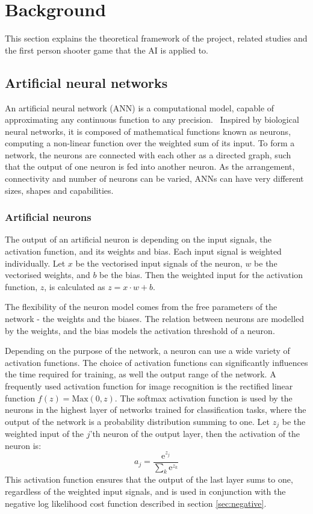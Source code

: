 
\section{Background}
\label{sec:background}
This section explains the theoretical framework of the project, related studies and the first person shooter game that the AI is applied to.

\subsection{Artificial neural networks}
An artificial neural network (ANN) is a computational model, capable of approximating any continuous function to any precision.~\cite{kurt} Inspired by biological neural networks, it is composed of mathematical functions known as neurons, computing a non-linear function over the weighted sum of its input. To form a network, the neurons are connected with each other as a directed graph, such that the output of one neuron is fed into another neuron. As the arrangement, connectivity and number of neurons can be varied, ANNs can have very different sizes, shapes and capabilities.

\subsubsection{Artificial neurons}
The output of an artificial neuron is depending on the input signals, the activation function, and its weights and bias. Each input signal is weighted individually. Let $x$ be the vectorised input signals of the neuron, $w$ be the vectorised weights, and $b$ be the bias. Then the weighted input for the activation function, $z$, is calculated as $z = x \cdot w + b$.

The flexibility of the neuron model comes from the free parameters of the network - the weights and the biases. The relation between neurons are modelled by the weights, and the bias models the activation threshold of a neuron.

Depending on the purpose of the network, a neuron can use a wide variety of activation functions. The choice of activation functions can significantly influences the time required for training, as well the output range of the network. A frequently used activation function for image recognition is the rectified linear function $f(z) = \text{Max}(0,z)$. The softmax activation function is used by the neurons in the highest layer of networks trained for classification tasks, where the output of the network is a probability distribution summing to one. Let $z_j$ be the weighted input of the $j$'th neuron of the output layer, then the activation of the neuron is:
$$a_j = \frac{ \text{e}^{z_j} }{ \sum_{k} \text{e}^{z_k} }$$
This activation function ensures that the output of the last layer sums to one, regardless of the weighted input signals, and is used in conjunction with the negative log likelihood cost function described in section \ref{sec:negative}.

